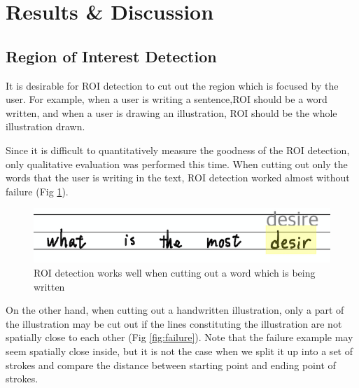 \section{Results \& Discussion}
\label{section:result-discussion}

\subsection{Region of Interest Detection}

It is desirable for ROI detection to cut out the region which is focused by
the user. For example, when a user is writing a sentence,ROI should be a word
written, and when a user is drawing an illustration, ROI should be the whole
illustration drawn.

Since it is difficult to quantitatively measure the goodness of the ROI detection,
only qualitative evaluation was performed this time.
When cutting out only the words that the user is writing in the text,
ROI detection worked almost without failure (Fig \ref{fig:cutting-word-region}).

\begin{figure}
    \centering
    \includegraphics[scale=0.6]{images/word_region.png}
    \caption{ROI detection works well when cutting out a word which is being written}
    \label{fig:cutting-word-region}
\end{figure}

On the other hand, when cutting out a handwritten illustration,
only a part of the illustration may be cut out if the lines constituting
the illustration are not spatially close to each other (Fig \ref{fig:failure}).
Note that the failure example may seem spatially close inside, but it is not the
case when we split it up into a set of strokes and compare the distance between
starting point and ending point of strokes.

